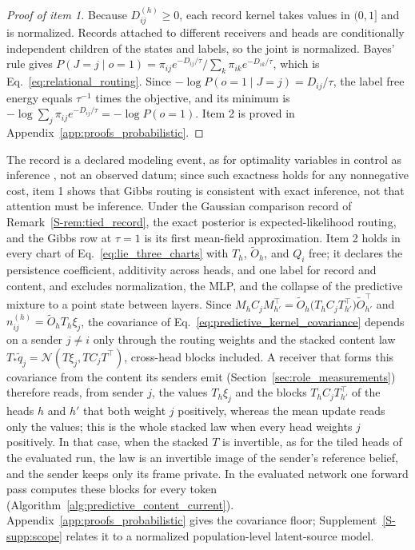 \documentclass[twoside,11pt]{article}
\begin{document}
\begin{proof}[Proof of item 1]
Because $D_{ij}^{(h)}\ge0$, each record kernel takes values in $(0,1]$ and is normalized. Records attached to different receivers and heads are conditionally independent children of the states and labels, so the joint is normalized. Bayes' rule gives $P(J=j\mid o=1)=\pi_{ij}e^{-D_{ij}/\tau}/\sum_k\pi_{ik}e^{-D_{ik}/\tau}$, which is Eq.~\eqref{eq:relational_routing}. Since $-\log P(o=1\mid J=j)=D_{ij}/\tau$, the label free energy equals $\tau^{-1}$ times the objective, and its minimum is $-\log\sum_j\pi_{ij}e^{-D_{ij}/\tau}=-\log P(o=1)$. Item 2 is proved in Appendix~\ref{app:proofs_probabilistic}.
\end{proof}
The record is a declared modeling event, as for optimality variables in control as inference \citep{ToussaintStorkey2006,Kappen2012,Levine2018}, not an observed datum; since such exactness holds for any nonnegative cost, item 1 shows that Gibbs routing is consistent with exact inference, not that attention must be inference. Under the Gaussian comparison record of Remark~\ref{S-rem:tied_record}, the exact posterior is expected-likelihood routing, and the Gibbs row at $\tau=1$ is its first mean-field approximation. Item 2 holds in every chart of Eq.~\eqref{eq:lie_three_charts} with $T_h$, $\widetilde O_h$, and $Q_i$ free; it declares the persistence coefficient, additivity across heads, and one label for record and content, and excludes normalization, the MLP, and the collapse of the predictive mixture to a point state between layers. Since $M_hC_jM_{h'}^\top=\widetilde O_h\bigl(T_hC_jT_{h'}^\top\bigr)\widetilde O_{h'}^\top$ and $n_{ij}^{(h)}=\widetilde O_hT_h\xi_j$, the covariance of Eq.~\eqref{eq:predictive_kernel_covariance} depends on a sender $j\ne i$ only through the routing weights and the stacked content law $T_*\widetilde q_j=\mathcal N(T\xi_j,TC_jT^\top)$, cross-head blocks included. A receiver that forms this covariance from the content its senders emit (Section~\ref{sec:role_measurements}) therefore reads, from sender $j$, the values $T_h\xi_j$ and the blocks $T_hC_jT_{h'}^\top$ of the heads $h$ and $h'$ that both weight $j$ positively, whereas the mean update reads only the values; this is the whole stacked law when every head weights $j$ positively. In that case, when the stacked $T$ is invertible, as for the tiled heads of the evaluated run, the law is an invertible image of the sender's reference belief, and the sender keeps only its frame private. In the evaluated network one forward pass computes these blocks for every token (Algorithm~\ref{alg:predictive_content_current}). Appendix~\ref{app:proofs_probabilistic} gives the covariance floor; Supplement~\ref{S-supp:scope} relates it to a normalized population-level latent-source model.
\end{document}

